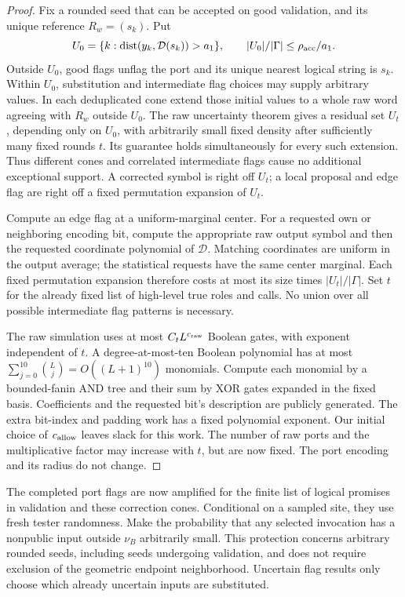 \begin{proof}
Fix a rounded seed that can be accepted on good validation, and its
unique reference $R_w=(s_k)$. Put
\[
 U_0=\{k:\operatorname{dist}(y_k,\mathcal D(s_k))>a_1\},
 \qquad |U_0|/|\Gamma|\leq\rho_{\rm acc}/a_1.
\]
Outside $U_0$, good flags unflag the port and its unique nearest logical
string is $s_k$. Within $U_0$, substitution and intermediate flag choices
may supply arbitrary values. In each deduplicated cone extend those
initial values to a whole raw word agreeing with $R_w$ outside $U_0$.
The raw uncertainty theorem gives a residual set $U_t$, depending only
on $U_0$, with arbitrarily small fixed density after sufficiently many
fixed rounds $t$. Its guarantee holds simultaneously for every such
extension. Thus different cones and correlated intermediate flags cause
no additional exceptional support. A corrected symbol is right off
$U_t$; a local proposal and edge flag are right off a fixed permutation
expansion of $U_t$.

Compute an edge flag at a uniform-marginal center. For a requested own
or neighboring encoding bit, compute the appropriate raw output symbol
and then the requested coordinate polynomial of $\mathcal D$. Matching
coordinates are uniform in the output average; the statistical requests
have the same center marginal. Each fixed permutation expansion
therefore costs at most its size times $|U_t|/|\Gamma|$. Set $t$ for
the already fixed list of high-level true roles and calls. No union over
all possible intermediate flag patterns is necessary.

The raw simulation uses at most $C_tL^{c_{\rm raw}}$ Boolean gates, with
exponent independent of $t$. A degree-at-most-ten Boolean polynomial has
at most $\sum_{j=0}^{10}\binom Lj=O((L+1)^{10})$ monomials. Compute each
monomial by a bounded-fanin AND tree and their sum by XOR gates expanded
in the fixed basis. Coefficients and the requested bit's description are
publicly generated. The extra bit-index and padding work has a fixed
polynomial exponent. Our initial choice of $c_{\rm allow}$ leaves
slack for this work. The number of raw ports and the multiplicative
factor may increase with $t$, but are now fixed. The port encoding and
its radius do not change.
\end{proof}

The completed port flags are now amplified for the finite list of
logical promises in validation and these correction cones. Conditional
on a sampled site, they use fresh tester randomness. Make the probability
that any selected invocation has a nonpublic input outside $\nu_B$
arbitrarily small. This protection concerns arbitrary rounded seeds,
including seeds undergoing validation, and does not require exclusion
of the geometric endpoint neighborhood. Uncertain flag results only
choose which already uncertain inputs are substituted.

